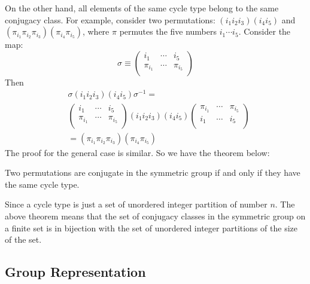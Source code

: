 On the other hand, all elements of the same cycle type belong to the
same conjugacy class. For example, consider two permutations:
$(i_1 i_2 i_3)(i_4 i_5)$ and $\left(\pi_{i_1}
\pi_{i_2}\pi_{i_3}\right)\left(\pi_{i_4}\pi_{i_5}\right)$, where $\pi$
permutes the five numbers $i_1 \cdots i_5$.
Consider the map:
\begin{equation}
    \sigma \equiv \left( \begin{array}{ccc}
            i_1      & \cdots & i_5 \\
            \pi_{i_1} & \cdots & \pi_{i_5} \\
        \end{array} \right)
\end{equation}
Then \begin{align*}
    &\sigma (i_1 i_2 i_3)(i_4 i_5) \sigma^{-1} =  \\
    &\left( \begin{array}{ccc}
            i_1      & \cdots & i_5 \\
            \pi_{i_1} & \cdots & \pi_{i_5} \\
        \end{array} \right)
        (i_1 i_2 i_3)(i_4 i_5)
        \left( \begin{array}{ccc}
            \pi_{i_1} & \cdots & \pi_{i_5} \\
            i_1      & \cdots & i_5 \\
        \end{array} \right) \\
    & = (\pi_{i_1} \pi_{i_2}\pi_{i_3})(\pi_{i_4}\pi_{i_5})
\end{align*}
The proof for the general case is similar. So we have the theorem
below:
\begin{thm}
    Two permutations are conjugate in the symmetric group if and only if they have the same cycle type.
\end{thm}
\begin{remark}
    \label{rmk:20161010-conjugacy_class_in_Sn}
    Since a cycle type is just a set of unordered integer partition of
    number $n$. The above theorem means that the set of conjugacy
    classes in the symmetric group on a finite set is in bijection
    with the set of unordered integer partitions of the size of the
    set. 
\end{remark}

\subsection{Group Representation}
\label{sec:Group-Representation}

